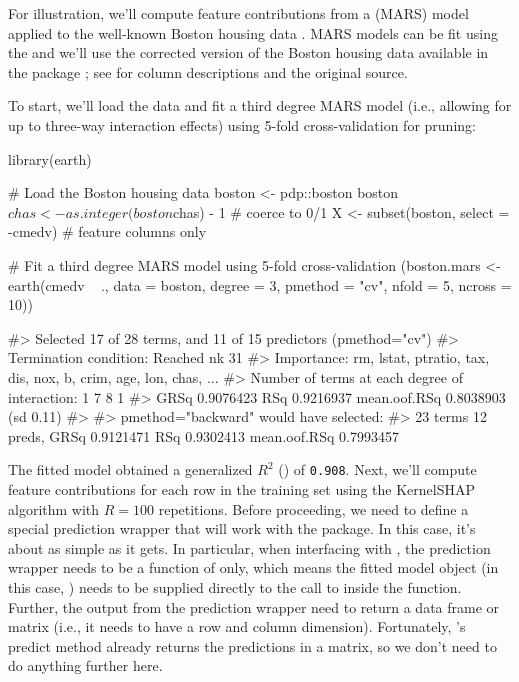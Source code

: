 For illustration, we'll compute feature contributions from a
 (MARS) model
\citep{friedman-1991-mars} applied to the well-known Boston housing data
\citep{harrison-1978-hedonic}. MARS models can be fit using the
 \citep{R-earth} and we'll use the corrected version of
the Boston housing data available in the  package
\cite{R-pdp}; see  for column descriptions and the
original source.

To start, we'll load the data and fit a third degree MARS model (i.e.,
allowing for up to three-way interaction effects) using 5-fold
cross-validation for pruning:

\begin{Schunk}
\begin{Sinput}
library(earth)

# Load the Boston housing data
boston <- pdp::boston
boston$chas <- as.integer(boston$chas) - 1  # coerce to 0/1
X <- subset(boston, select = -cmedv)  # feature columns only

# Fit a third degree MARS model using 5-fold cross-validation
(boston.mars <- earth(cmedv ~ ., data = boston, degree = 3, pmethod = "cv",
                      nfold = 5, ncross = 10))
\end{Sinput}
\begin{Soutput}
#> Selected 17 of 28 terms, and 11 of 15 predictors (pmethod="cv")
#> Termination condition: Reached nk 31
#> Importance: rm, lstat, ptratio, tax, dis, nox, b, crim, age, lon, chas, ...
#> Number of terms at each degree of interaction: 1 7 8 1
#> GRSq 0.9076423  RSq 0.9216937  mean.oof.RSq 0.8038903 (sd 0.11)
#> 
#> pmethod="backward" would have selected:
#>     23 terms 12 preds,  GRSq 0.9121471  RSq 0.9302413  mean.oof.RSq 0.7993457
\end{Soutput}
\end{Schunk}

The fitted model obtained a generalized \(R^2\) () of
\texttt{0.908}. Next, we'll compute feature contributions for each row
in the training set using the KernelSHAP algorithm with \(R = 100\)
repetitions. Before proceeding, we need to define a special prediction
wrapper that will work with the  package. In this case, it's
about as simple as it gets. In particular, when interfacing with
, the prediction wrapper needs to be a function of
 only, which means the fitted model object (in this case,
) needs to be supplied directly to the call to
 inside the function. Further, the output from the
prediction wrapper need to return a data frame or matrix (i.e., it needs
to have a row and column dimension). Fortunately, 's predict
method already returns the predictions in a matrix, so we don't need to
do anything further here.

